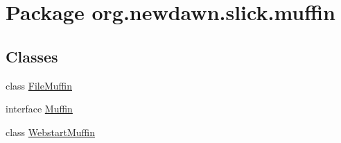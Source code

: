 \hypertarget{namespaceorg_1_1newdawn_1_1slick_1_1muffin}{}\section{Package org.\+newdawn.\+slick.\+muffin}
\label{namespaceorg_1_1newdawn_1_1slick_1_1muffin}
\subsection*{Classes}
\begin{DoxyCompactItemize}
\item 
class \mbox{\hyperlink{classorg_1_1newdawn_1_1slick_1_1muffin_1_1_file_muffin}{File\+Muffin}}
\item 
interface \mbox{\hyperlink{interfaceorg_1_1newdawn_1_1slick_1_1muffin_1_1_muffin}{Muffin}}
\item 
class \mbox{\hyperlink{classorg_1_1newdawn_1_1slick_1_1muffin_1_1_webstart_muffin}{Webstart\+Muffin}}
\end{DoxyCompactItemize}
